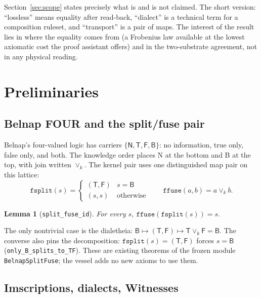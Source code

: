 \documentclass[12pt,a4paper]{article}
\newtheorem{lemma}[theorem]{Lemma}
\newcommand{\bN}{\textsf{N}}
\newcommand{\bT}{\textsf{T}}
\newcommand{\bF}{\textsf{F}}
\newcommand{\bB}{\textsf{B}}
\begin{document}
Section~\ref{sec:scope} states precisely what is and is not claimed. The
short version: ``lossless'' means equality after read-back, ``dialect'' is
a technical term for a composition ruleset, and ``transport'' is a pair of
maps. The interest of the result lies in where the equality comes from
(a Frobenius law available at the lowest axiomatic cost the proof assistant
offers) and in the two-substrate agreement, not in any physical reading.

\section{Preliminaries}
\label{sec:prelim}

\subsection{Belnap FOUR and the split/fuse pair}

Belnap's four-valued logic \cite{Belnap1977} has carriers
$\{\bN, \bT, \bF, \bB\}$: no information, true only, false only, and both.
The knowledge order places \bN{} at the bottom and \bB{} at the top, with
join written $\vee_k$. The kernel pair uses one distinguished map pair on
this lattice:
\[
\texttt{fsplit}(s) =
\begin{cases}
(\bT, \bF) & s = \bB\\
(s, s) & \text{otherwise}
\end{cases}
\qquad
\texttt{ffuse}(a, b) = a \vee_k b .
\]

\begin{lemma}[\texttt{split\_fuse\_id}]
For every $s$, $\texttt{ffuse}(\texttt{fsplit}(s)) = s$.
\end{lemma}

The only nontrivial case is the dialetheia:
$\bB \mapsto (\bT, \bF) \mapsto \bT \vee_k \bF = \bB$. The converse also
pins the decomposition: $\texttt{fsplit}(s) = (\bT,\bF)$ forces $s = \bB$
(\texttt{only\_B\_splits\_to\_TF}). These are existing theorems of the
frozen module \texttt{BelnapSplitFuse}; the vessel adds no new axioms to
use them.

\subsection{Imscriptions, dialects, Witnesses}
\end{document}
